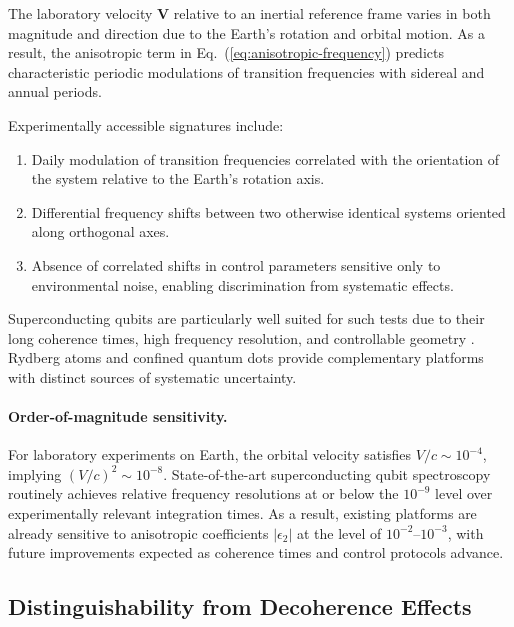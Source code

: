 \documentclass[11pt]{article}
\begin{document}
            The laboratory velocity $\mathbf{V}$ relative to an inertial reference frame varies in both magnitude and direction due to the Earth's rotation and orbital motion. As a result, the anisotropic term in Eq.~(\ref{eq:anisotropic-frequency}) predicts characteristic periodic modulations of transition frequencies with sidereal and annual periods.

            Experimentally accessible signatures include:
            \begin{enumerate}
                \item Daily modulation of transition frequencies correlated with the orientation of the system relative to the Earth's rotation axis.
                \item Differential frequency shifts between two otherwise identical systems oriented along orthogonal axes.
                \item Absence of correlated shifts in control parameters sensitive only to environmental noise, enabling discrimination from systematic effects.
            \end{enumerate}

            Superconducting qubits are particularly well suited for such tests due to their long coherence times, high frequency resolution, and controllable geometry \cite{ClarkeWilhelm2008}. Rydberg atoms and confined quantum dots provide complementary platforms with distinct sources of systematic uncertainty.

            \paragraph{Order-of-magnitude sensitivity.}
            For laboratory experiments on Earth, the orbital velocity satisfies
            $V/c \sim 10^{-4}$, implying $(V/c)^2 \sim 10^{-8}$. State-of-the-art
            superconducting qubit spectroscopy routinely achieves relative frequency
            resolutions at or below the $10^{-9}$ level over experimentally relevant
            integration times. As a result, existing platforms are already sensitive
            to anisotropic coefficients $|\epsilon_2|$ at the level of $10^{-2}$--$10^{-3}$,
            with future improvements expected as coherence times and control protocols
            advance.

        \subsection{Distinguishability from Decoherence Effects}
\end{document}
